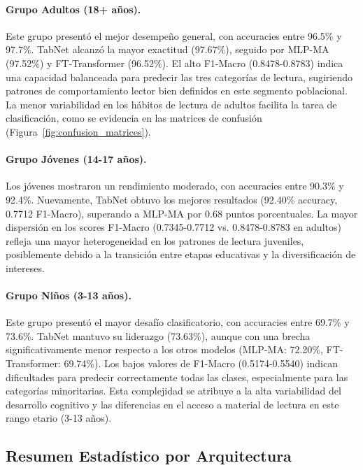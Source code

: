 \documentclass[12pt,a4paper]{article}
\begin{document}
\paragraph{Grupo Adultos (18+ años).} Este grupo presentó el mejor desempeño general, con accuracies entre 96.5\% y 97.7\%. TabNet alcanzó la mayor exactitud (97.67\%), seguido por MLP-MA (97.52\%) y FT-Transformer (96.52\%). El alto F1-Macro (0.8478-0.8783) indica una capacidad balanceada para predecir las tres categorías de lectura, sugiriendo patrones de comportamiento lector bien definidos en este segmento poblacional. La menor variabilidad en los hábitos de lectura de adultos facilita la tarea de clasificación, como se evidencia en las matrices de confusión (Figura~\ref{fig:confusion_matrices}).

\paragraph{Grupo Jóvenes (14-17 años).} Los jóvenes mostraron un rendimiento moderado, con accuracies entre 90.3\% y 92.4\%. Nuevamente, TabNet obtuvo los mejores resultados (92.40\% accuracy, 0.7712 F1-Macro), superando a MLP-MA por 0.68 puntos porcentuales. La mayor dispersión en los scores F1-Macro (0.7345-0.7712 vs. 0.8478-0.8783 en adultos) refleja una mayor heterogeneidad en los patrones de lectura juveniles, posiblemente debido a la transición entre etapas educativas y la diversificación de intereses.

\paragraph{Grupo Niños (3-13 años).} Este grupo presentó el mayor desafío clasificatorio, con accuracies entre 69.7\% y 73.6\%. TabNet mantuvo su liderazgo (73.63\%), aunque con una brecha significativamente menor respecto a los otros modelos (MLP-MA: 72.20\%, FT-Transformer: 69.74\%). Los bajos valores de F1-Macro (0.5174-0.5540) indican dificultades para predecir correctamente todas las clases, especialmente para las categorías minoritarias. Esta complejidad se atribuye a la alta variabilidad del desarrollo cognitivo y las diferencias en el acceso a material de lectura en este rango etario (3-13 años).


\subsection{Resumen Estadístico por Arquitectura}
\end{document}
